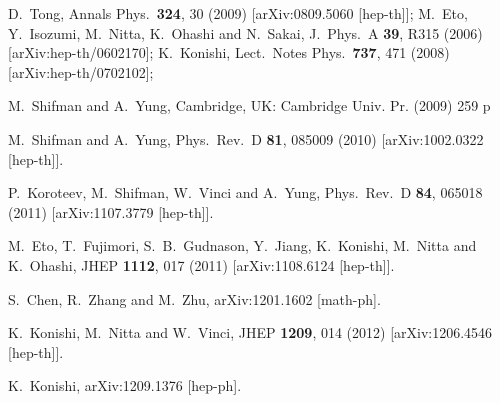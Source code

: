 \documentclass[12pt]{article}
\begin{document}
\small
\begin{thebibliography}{99}
\itemsep -2pt

  D.~Tong,
  Annals Phys.\  {\bf 324}, 30 (2009)
  [arXiv:0809.5060 [hep-th]];
  M.~Eto, Y.~Isozumi, M.~Nitta, K.~Ohashi and N.~Sakai,
  J.\ Phys.\ A  {\bf 39}, R315 (2006)
  [arXiv:hep-th/0602170];
  K.~Konishi,
  Lect.\ Notes Phys.\  {\bf 737}, 471 (2008)
  [arXiv:hep-th/0702102];

  M.~Shifman and A.~Yung,
  Cambridge, UK: Cambridge Univ. Pr. (2009) 259 p

  M.~Shifman and A.~Yung,
  Phys.\ Rev.\ D {\bf 81}, 085009 (2010)
  [arXiv:1002.0322 [hep-th]].

  P.~Koroteev, M.~Shifman, W.~Vinci and A.~Yung,
  Phys.\ Rev.\ D {\bf 84}, 065018 (2011)
  [arXiv:1107.3779 [hep-th]].

  M.~Eto, T.~Fujimori, S.~B.~Gudnason, Y.~Jiang, K.~Konishi, M.~Nitta and K.~Ohashi,
  JHEP {\bf 1112}, 017 (2011)
  [arXiv:1108.6124 [hep-th]].

  S.~Chen, R.~Zhang and M.~Zhu,
  arXiv:1201.1602 [math-ph].

  K.~Konishi, M.~Nitta and W.~Vinci,
  JHEP {\bf 1209}, 014 (2012)
  [arXiv:1206.4546 [hep-th]].

  K.~Konishi,
  arXiv:1209.1376 [hep-ph].


\end{thebibliography}
\end{document}
